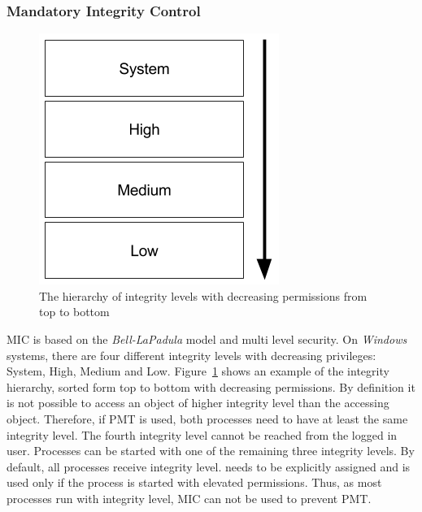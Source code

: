 \subsubsection{Mandatory Integrity Control}
\label{sec:mic}
\begin{figure}[h]
\centering
\includegraphics[scale=0.5]{sections/background/defenses/mic.png}
\caption{The hierarchy of integrity levels with decreasing permissions from top to bottom}
\label{fig:mic}
\end{figure}
\gls{MIC} is based on the \emph{Bell-LaPadula} \cite{eckert2014sicherheit} model and multi level security. On \emph{Windows} systems, there are four different integrity levels with decreasing privileges: System, High, Medium and Low. Figure~\ref{fig:mic} shows an example of the integrity hierarchy, sorted form top to bottom with decreasing permissions. By definition it is not possible to access an object of higher integrity level than the accessing object. Therefore, if \gls{PMT} is used, both processes need to have at least the same integrity level. The fourth integrity level  cannot be reached from the logged in user. Processes can be started with one of the remaining three integrity levels. By default, all processes receive  integrity level.  needs to be explicitly assigned and  is used only if the process is started with elevated permissions. Thus, as most processes run with  integrity level, \gls{MIC} can not be used to prevent \gls{PMT}.